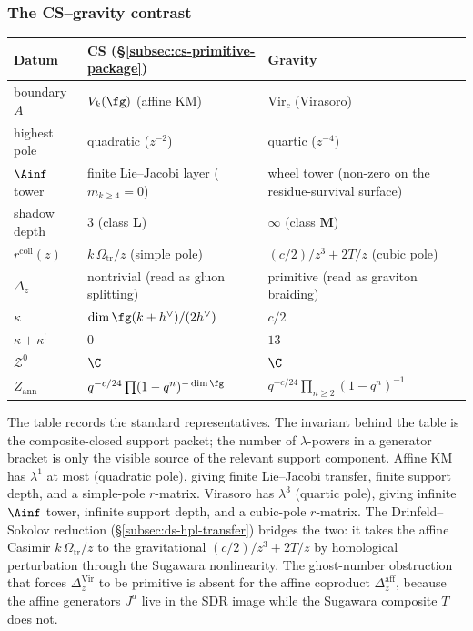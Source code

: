 \subsubsection*{The CS--gravity contrast}

\begin{center}
\small
\renewcommand{\arraystretch}{1.15}
\begin{tabular}{lll}
\textbf{Datum} & \textbf{CS (\S\ref{subsec:cs-primitive-package})}
 & \textbf{Gravity} \\
\hline
boundary $A$
 & $V_k(\fg)$ (affine KM)
 & $\mathrm{Vir}_c$ (Virasoro) \\[2pt]
highest pole
 & quadratic ($z^{-2}$)
 & quartic ($z^{-4}$) \\[2pt]
$\Ainf$ tower
 & finite Lie--Jacobi layer ($m_{k \ge 4}=0$)
 & wheel tower (non-zero on the residue-survival surface) \\[2pt]
shadow depth
 & $3$ (class $\mathbf{L}$)
 & $\infty$ (class $\mathbf{M}$) \\[2pt]
$r^{\mathrm{coll}}(z)$
 & $k\,\Omega_{\mathrm{tr}}/z$ (simple pole)
 & $(c/2)/z^3 + 2T/z$ (cubic pole) \\[2pt]
$\Delta_z$
 & nontrivial (read as gluon splitting)
 & primitive (read as graviton braiding) \\[2pt]
$\kappa$
 & $\dim\fg(k+h^\vee)/(2h^\vee)$
 & $c/2$ \\[2pt]
$\kappa + \kappa^!$
 & $0$
 & $13$ \\[2pt]
$\mathcal{Z}^0$
 & $\C$
 & $\C$ \\[2pt]
$Z_{\mathrm{ann}}$
 & $q^{-c/24}\prod(1-q^n)^{-\dim\fg}$
 & $q^{-c/24}\prod_{n \ge 2}(1-q^n)^{-1}$
\end{tabular}
\end{center}

The table records the standard representatives. The invariant behind
the table is the composite-closed support packet; the number of
$\lambda$-powers in a generator bracket is only the visible source of
the relevant support component.
Affine KM has $\lambda^1$ at most (quadratic pole), giving
finite Lie--Jacobi transfer, finite support depth, and a simple-pole
$r$-matrix.
Virasoro has $\lambda^3$ (quartic pole), giving infinite
$\Ainf$ tower, infinite support depth, and a cubic-pole
$r$-matrix.
The Drinfeld--Sokolov reduction
(\S\ref{subsec:ds-hpl-transfer}) bridges the two: it takes
the affine Casimir $k\,\Omega_{\mathrm{tr}}/z$ to the gravitational
$(c/2)/z^3 + 2T/z$ by homological perturbation through the
Sugawara nonlinearity.
The ghost-number obstruction that forces
$\Delta_z^{\mathrm{Vir}}$ to be primitive is absent for the
affine coproduct $\Delta_z^{\mathrm{aff}}$, because the
affine generators $J^a$ live in the SDR image while the
Sugawara composite $T$ does not.

